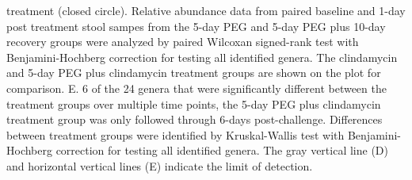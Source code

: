 \documentclass[
  11pt,
]{article}
\begin{document}
treatment (closed circle). Relative abundance data from paired baseline
and 1-day post treatment stool sampes from the 5-day PEG and 5-day PEG
plus 10-day recovery groups were analyzed by paired Wilcoxan signed-rank
test with Benjamini-Hochberg correction for testing all identified
genera. The clindamycin and 5-day PEG plus clindamycin treatment groups
are shown on the plot for comparison. E. 6 of the 24 genera that were
significantly different between the treatment groups over multiple time
points, the 5-day PEG plus clindamycin treatment group was only followed
through 6-days post-challenge. Differences between treatment groups were
identified by Kruskal-Wallis test with Benjamini-Hochberg correction for
testing all identified genera. The gray vertical line (D) and horizontal
vertical lines (E) indicate the limit of detection. \newpage
\end{document}
